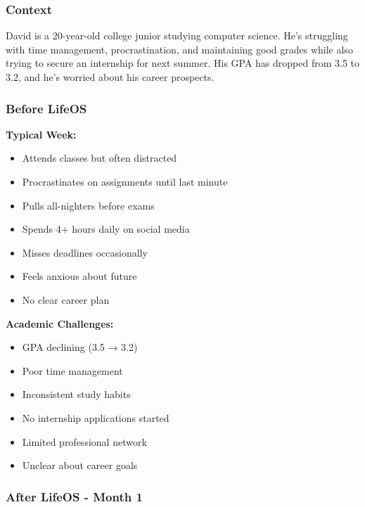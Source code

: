 \subsubsection{Context}

David is a 20-year-old college junior studying computer science. He's struggling with time management, procrastination, and maintaining good grades while also trying to secure an internship for next summer. His GPA has dropped from 3.5 to 3.2, and he's worried about his career prospects.

\subsubsection{Before LifeOS}

\textbf{Typical Week:}
\begin{itemize}
    \item Attends classes but often distracted
    \item Procrastinates on assignments until last minute
    \item Pulls all-nighters before exams
    \item Spends 4+ hours daily on social media
    \item Misses deadlines occasionally
    \item Feels anxious about future
    \item No clear career plan
\end{itemize}

\textbf{Academic Challenges:}
\begin{itemize}
    \item GPA declining (3.5 → 3.2)
    \item Poor time management
    \item Inconsistent study habits
    \item No internship applications started
    \item Limited professional network
    \item Unclear about career goals
\end{itemize}

\subsubsection{After LifeOS - Month 1}

